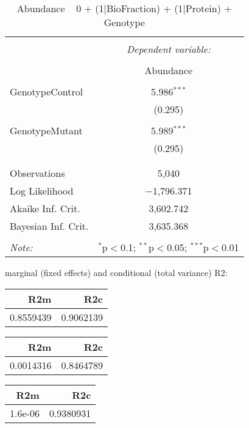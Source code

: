 \documentclass[11pt]{report}
\begin{document}
\begin{table}[!htbp] \centering 
  \caption{Abundance ~ 0 + (1|BioFraction) + (1|Protein) + Genotype} 
  \label{} 
\begin{tabular}{@{\extracolsep{5pt}}lc} 
\\[-1.8ex]\hline 
\hline \\[-1.8ex] 
 & \multicolumn{1}{c}{\textit{Dependent variable:}} \\ 
\cline{2-2} 
\\[-1.8ex] & Abundance \\ 
\hline \\[-1.8ex] 
 GenotypeControl & 5.986$^{***}$ \\ 
  & (0.295) \\ 
  & \\ 
 GenotypeMutant & 5.989$^{***}$ \\ 
  & (0.295) \\ 
  & \\ 
\hline \\[-1.8ex] 
Observations & 5,040 \\ 
Log Likelihood & $-$1,796.371 \\ 
Akaike Inf. Crit. & 3,602.742 \\ 
Bayesian Inf. Crit. & 3,635.368 \\ 
\hline 
\hline \\[-1.8ex] 
\textit{Note:}  & \multicolumn{1}{r}{$^{*}$p$<$0.1; $^{**}$p$<$0.05; $^{***}$p$<$0.01} \\ 
\end{tabular} 
\end{table} 
marginal (fixed effects) and conditional (total variance) R2:

\begin{tabular}{r|r}
\hline
R2m & R2c\\
\hline
0.8559439 & 0.9062139\\
\hline
\end{tabular}

\begin{tabular}{r|r}
\hline
R2m & R2c\\
\hline
0.0014316 & 0.8464789\\
\hline
\end{tabular}

\begin{tabular}{r|r}
\hline
R2m & R2c\\
\hline
1.6e-06 & 0.9380931\\
\hline
\end{tabular}
\end{document}
